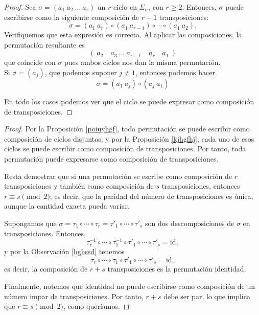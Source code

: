 \begin{proposicion}\label{kjhgfhj}
\end{proposicion}

\begin{proof}
	Sea \(\sigma = (a_1\ a_2\ \dots\ a_r)\) un \(r\)-ciclo en \(\Sigma_n\), con \(r \geq 2\). Entonces, \(\sigma\) puede escribirse como la siguiente composición de \(r-1\) transposiciones:
	\[
	\sigma = (a_1\ a_r) \circ (a_1\ a_{r-1}) \circ \cdots \circ (a_1\ a_2).
	\]
	Verifiquemos que esta expresión es correcta. Al aplicar las composiciones, la permutación resultante es
	\[ (\:a_2\quad a_3\ \dots\ a_{r-1}\quad a_r\quad a_1\:)
	\]
	que coincide con \(\sigma\) pues ambos ciclos nos dan la misma permutación.\\
	
	\noindent Si $\sigma =(a_j)$, que podemos suponer $j\neq1 $, entonces podemos hacer $$\sigma=(a_1\ a_j)\circ(a_j\ a_1)$$ 
	
	\noindent En todo los casos podemos ver que el ciclo se puede expresar como composición de transposiciones. 
\end{proof}




\begin{proposicion}
\end{proposicion}

\begin{proof}
	Por la Proposición \ref{poiuyhgf}, toda permutación se puede escribir como composición de ciclos disjuntos, y por la Proposición \ref{kjhgfhj}, cada uno de esos ciclos se puede escribir como composición de transposiciones. Por tanto, toda permutación puede expresarse como composición de transposiciones.
	
	\medskip
	\noindent
	Resta demostrar que si una permutación se escribe como composición de \( r \) transposiciones y también como composición de \( s \) transposiciones, entonces \( r \equiv s \pmod{2} \); es decir, que la paridad del número de transposiciones es única, aunque la cantidad exacta pueda variar.
	
	\medskip
	\noindent
	Supongamos que \( \sigma = \tau_1 \circ \cdots \circ \tau_r = \tau'_1 \circ \cdots \circ \tau'_s \) son dos descomposiciones de \( \sigma \) en transposiciones. Entonces,
	\[
	\tau_r^{-1} \circ \cdots \circ \tau_1^{-1} \circ \tau'_1 \circ \cdots \circ \tau'_s = \text{id},
	\]
	y por la Observación \ref{hghssd} tenemos 
	\[
	\tau_r \circ \cdots \circ \tau_1 \circ \tau'_1 \circ \cdots \circ \tau'_s = \text{id},
	\]
	es decir, la composición de \( r + s \) transposiciones es la permutación identidad.
	
	\medskip
	\noindent
	Finalmente, notemos que identidad no puede escribirse como composición de un número impar de transposiciones. Por tanto, \( r + s \) debe ser par, lo que implica que \( r \equiv s \pmod{2} \), como queríamos.
\end{proof}

